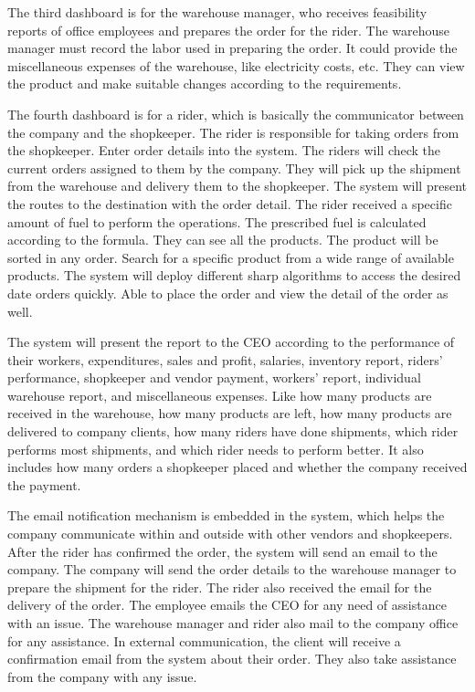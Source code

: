 \documentclass[12pt,a4paper]{article}
\begin{document}
The third dashboard is for the warehouse manager, who receives feasibility reports of office employees and prepares the order for the rider. The warehouse manager must record the labor used in preparing the order. It could provide the miscellaneous expenses of the warehouse, like electricity costs, etc. They can view the product and make suitable changes according to the requirements.
 
The fourth dashboard is for a rider, which is basically the communicator between the company and the shopkeeper.
The rider is responsible for taking orders from the shopkeeper. 
Enter order details into the system. 
The riders will check the current orders assigned to them by the company. They will pick up the shipment from the warehouse and delivery them to the shopkeeper. The system will present the routes to the destination with the order detail. The rider received a specific amount of fuel to perform the operations. The prescribed fuel is calculated according to the formula. They can see all the products. The product will be sorted in any order. Search for a specific product from a wide range of available products. The system will deploy different sharp algorithms to access the desired date orders quickly. Able to place the order and view the detail of the order as well. 
 
The system will present the report to the CEO according to the performance of their workers, expenditures, sales and profit, salaries, inventory report, riders' performance, shopkeeper and vendor payment, workers' report, individual warehouse report, and miscellaneous expenses.
Like how many products are received in the warehouse, how many products are left, how many products are delivered to company clients, how many riders have done shipments, which rider performs most shipments, and which rider needs to perform better. It also includes how many orders a shopkeeper placed and whether the company received the payment. 
 
The email notification mechanism is embedded in the system, which helps the company communicate within and outside with other vendors and shopkeepers. After the rider has confirmed the order, the system will send an email to the company. The company will send the order details to the warehouse manager to prepare the shipment for the rider. The rider also received the email for the delivery of the order. The employee emails the CEO for any need of assistance with an issue. The warehouse manager and rider also mail to the company office for any assistance. In external communication, the client will receive a confirmation email from the system about their order. They also take assistance from the company with any issue. 
 
\end{document}
